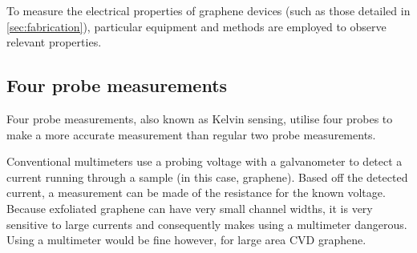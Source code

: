\documentclass[../../Matt_Gebert_Honours_Thesis.tex]{subfiles}
\begin{document}
	
	To measure the electrical properties of graphene devices (such as those detailed in \cref{sec:fabrication}), particular equipment and methods are employed to observe relevant properties. 
	
	\subsection{Four probe measurements}
	Four probe measurements, also known as Kelvin sensing, utilise four probes to make a more accurate measurement than regular two probe measurements. 
	
	Conventional multimeters use a probing voltage with a galvanometer to detect a current running through a sample (in this case, graphene). Based off the detected current, a measurement can be made of the resistance for the known voltage. Because exfoliated graphene can have very small channel widths, it is very sensitive to large currents and consequently makes using a multimeter dangerous. Using a multimeter would be fine however, for large area CVD graphene.
	
\end{document}
